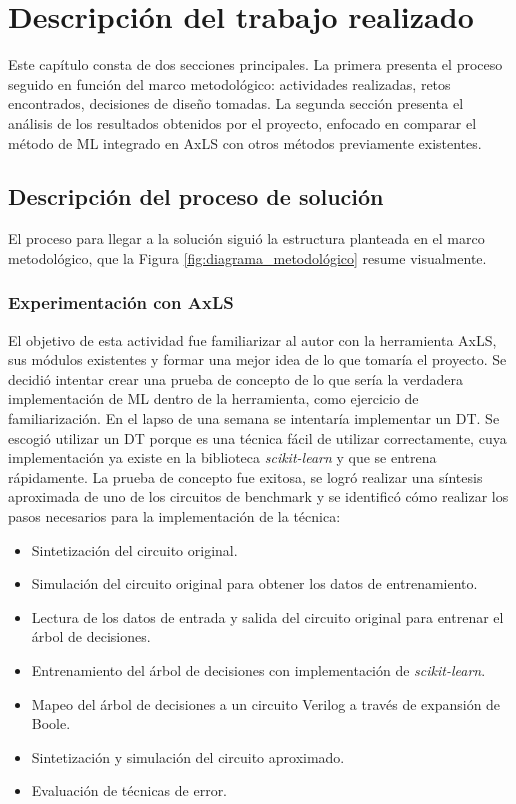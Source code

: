 \chapter{Descripción del trabajo realizado}

Este capítulo consta de dos secciones principales. La primera presenta el
proceso seguido en función del marco metodológico: actividades realizadas,
retos encontrados, decisiones de diseño tomadas. La segunda sección presenta el
análisis de los resultados obtenidos por el proyecto, enfocado en comparar el
método de ML integrado en AxLS con otros métodos previamente existentes.

\section{Descripción del proceso de solución}

El proceso para llegar a la solución siguió la estructura planteada en el marco
metodológico, que la Figura \ref{fig:diagrama_metodológico} resume visualmente.

\subsection{Experimentación con AxLS}

El objetivo de esta actividad fue familiarizar al autor con la herramienta
AxLS, sus módulos existentes y formar una mejor idea de lo que tomaría el
proyecto. Se decidió intentar crear una prueba de concepto de lo que sería la
verdadera implementación de ML dentro de la herramienta, como ejercicio de
familiarización.
En el lapso de una semana se intentaría implementar un DT. Se
escogió utilizar un DT porque es una técnica fácil de utilizar correctamente,
cuya implementación ya existe en la biblioteca \emph{scikit-learn} y que se
entrena rápidamente.
La prueba de concepto fue exitosa, se logró realizar una síntesis aproximada de
uno de los circuitos de benchmark y se identificó cómo realizar los pasos
necesarios para la implementación de la técnica:

\begin{itemize}
    \item Sintetización del circuito original.
    \item Simulación del circuito original para obtener los datos de entrenamiento.
    \item Lectura de los datos de entrada y salida del circuito original para
      entrenar el árbol de decisiones.
    \item Entrenamiento del árbol de decisiones con implementación de
      \emph{scikit-learn}.
    \item Mapeo del árbol de decisiones a un circuito Verilog a través de
      expansión de Boole.
    \item Sintetización y simulación del circuito aproximado.
    \item Evaluación de técnicas de error.
\end{itemize}

